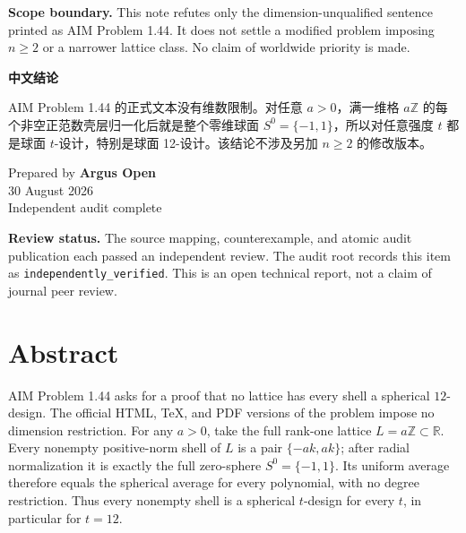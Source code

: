 \documentclass[11pt]{article}
\newcommand{\artifact}[1]{\texttt{\small #1}}
\theoremstyle{argusplain}
\begin{document}
\begin{titlepage}
\vspace{5mm}
\begin{scopebox}
\textsf{\bfseries\color{ArgusNavy}Scope boundary.}
This note refutes only the dimension-unqualified sentence printed as AIM Problem 1.44.
It does not settle a modified problem imposing $n\geq2$ or a narrower lattice class.
No claim of worldwide priority is made.
\end{scopebox}

\vfill
\begin{minipage}[b]{0.59\textwidth}
{\sffamily\bfseries\color{ArgusNavy}中文结论}\par
{\small AIM Problem 1.44 的正式文本没有维数限制。对任意 $a>0$，满一维格 $a\mathbb Z$ 的每个非空正范数壳层归一化后就是整个零维球面 $S^0=\{-1,1\}$，所以对任意强度 $t$ 都是球面 $t$-设计，特别是球面 12-设计。该结论不涉及另加 $n\geq2$ 的修改版本。}
\end{minipage}
\hfill
\begin{minipage}[b]{0.30\textwidth}
\raggedleft\sffamily\small
Prepared by \textbf{Argus Open}\\
30 August 2026\\[2mm]
Independent audit complete
\end{minipage}
\end{titlepage}

\tableofcontents
\vspace{4mm}

\begin{notebox}
\textsf{\bfseries\color{ArgusNavy}Review status.}
The source mapping, counterexample, and atomic audit publication each passed an independent review. The audit root records this item as \artifact{independently\_verified}. This is an open technical report, not a claim of journal peer review.
\end{notebox}

\section{Abstract}

AIM Problem 1.44 asks for a proof that no lattice has every shell a spherical $12$-design. The official HTML, TeX, and PDF versions of the problem impose no dimension restriction. For any $a>0$, take the full rank-one lattice $L=a\mathbb Z\subset\mathbb R$. Every nonempty positive-norm shell of $L$ is a pair $\{-ak,ak\}$; after radial normalization it is exactly the full zero-sphere $S^0=\{-1,1\}$. Its uniform average therefore equals the spherical average for every polynomial, with no degree restriction. Thus every nonempty shell is a spherical $t$-design for every $t$, in particular for $t=12$.
\end{document}
